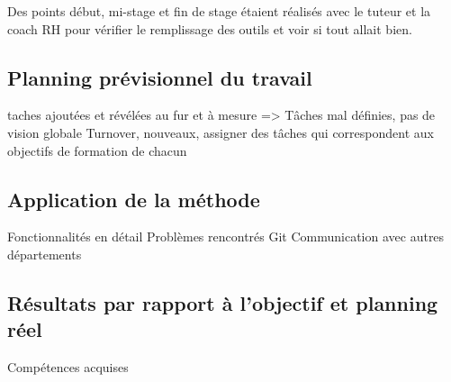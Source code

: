 Des points début, mi-stage et fin de stage étaient réalisés avec le tuteur et la coach RH pour vérifier le remplissage des outils et voir si tout allait bien.

\pagebreak
\subsection{Planning prévisionnel du travail}


taches ajoutées et révélées au fur et à mesure => Tâches mal définies, pas de vision globale
Turnover, nouveaux, assigner des tâches qui correspondent aux objectifs de formation de chacun


\pagebreak
\subsection{Application de la méthode}

Fonctionnalités en détail
Problèmes rencontrés
Git
Communication avec autres départements

\pagebreak
\subsection{Résultats par rapport à l'objectif et planning réel}
Compétences acquises








